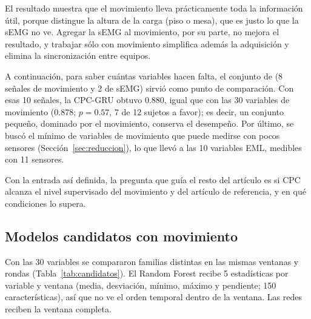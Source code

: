 \documentclass[letterpaper,11pt]{article}
\begin{document}
El resultado muestra que el movimiento lleva prácticamente toda la información útil, porque distingue la altura de la carga (piso o mesa), que es justo lo que la sEMG no ve. Agregar la sEMG al movimiento, por su parte, no mejora el resultado, y trabajar sólo con movimiento simplifica además la adquisición y elimina la sincronización entre equipos.

A continuación, para saber cuántas variables hacen falta, el conjunto de \textcite{bassani2025} (8 señales de movimiento y 2 de sEMG) sirvió como punto de comparación. Con esas 10 señales, la CPC-GRU obtuvo 0.880, igual que con las 30 variables de movimiento (0.878; $p = 0.57$, 7 de 12 sujetos a favor); es decir, un conjunto pequeño, dominado por el movimiento, conserva el desempeño. Por último, se buscó el mínimo de variables de movimiento que puede medirse con pocos sensores (Sección~\ref{sec:reduccion}), lo que llevó a las 10 variables EML, medibles con 11 sensores.

Con la entrada así definida, la pregunta que guía el resto del artículo es si CPC alcanza el nivel supervisado del movimiento y del artículo de referencia, y en qué condiciones lo supera.

\subsection{Modelos candidatos con movimiento}
Con las 30 variables se compararon familias distintas en las mismas ventanas y rondas (Tabla~\ref{tab:candidatos}). El Random Forest recibe 5 estadísticas por variable y ventana (media, desviación, mínimo, máximo y pendiente; 150 características), así que no ve el orden temporal dentro de la ventana. Las redes reciben la ventana completa.
\end{document}
